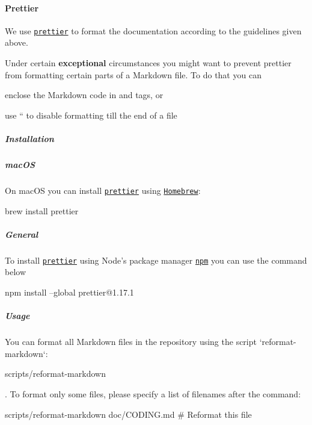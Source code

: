 \paragraph*{Prettier}

We use \href{https://prettier.io}{\tt {\ttfamily prettier}} to format the documentation according to the guidelines given above.

Under certain {\bfseries exceptional} circumstances you might want to prevent {\ttfamily prettier} from formatting certain parts of a Markdown file. To do that you can


\begin{DoxyItemize}
\item enclose the Markdown code in {\ttfamily and} tags, or
\item use `` to disable formatting till the end of a file
\end{DoxyItemize}

\subparagraph*{Installation}

\subparagraph*{mac\+OS}

On mac\+OS you can install \href{https://prettier.io}{\tt {\ttfamily prettier}} using \href{https://brew.sh}{\tt Homebrew}\+:


\begin{DoxyCode}
brew install prettier
\end{DoxyCode}


\subparagraph*{General}

To install \href{https://prettier.io}{\tt {\ttfamily prettier}} using Node’s package manager \href{https://www.npmjs.com}{\tt npm} you can use the command below


\begin{DoxyCode}
npm install --global prettier@1.17.1
\end{DoxyCode}


\subparagraph*{Usage}

You can format all Markdown files in the repository using the script `reformat-\/markdown`\+:


\begin{DoxyCode}
scripts/reformat-markdown
\end{DoxyCode}


. To format only some files, please specify a list of filenames after the command\+:


\begin{DoxyCode}
scripts/reformat-markdown doc/CODING.md # Reformat this file
\end{DoxyCode}


